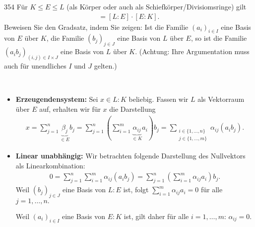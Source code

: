 \begin{algebraUE}{354}
Für $K \leq E \leq L$ (als Körper oder auch als Schiefkörper/Divisiomsringe) gilt
\begin{align*}
  [L:K] = [L:E]\cdot[E:K].
\end{align*}
Beweisen Sie den Gradsatz, indem Sie zeigen: Ist die Familie $(a_i)_{i \in I}$
eine Basis von $E$ über $K$, die Familie $(b_j)_{j \in J}$ eine Basis von $L$ über $E$,
so ist die Familie $(a_ib_j)_{(i,j) \in I \times J}$ eine Basis von $L$ über $K$.
(Achtung: Ihre Argumentation muss auch für unendliches $I$ und $J$ gelten.)

\end{algebraUE}

\begin{solution}
\leavevmode \\
  \begin{itemize}
      \item \textbf{Erzeugendensystem:} Sei $x \in L:K$ beliebig. Fassen wir $L$ als Vektorraum über $E$ auf, erhalten wir für $x$
      die Darstellung
  \begin{align*}
      x = \sum_{j=1}^n \underbrace{\beta_j}_{\in E} b_j = \sum_{j=1}^n \left(\sum_{i=1}^m \underbrace{\alpha_{ij}}_{\in K} a_i \right) b_j = \sum_{\substack{i \in \{1, ..., n\} \\ {j\in \{1,...,m\}}}} \alpha_{ij} (a_i b_j).
  \end{align*}
  \item \textbf{Linear unabhängig:} Wir betrachten folgende Darstellung des Nullvektors als Linearkombination:
  \begin{align*}
      0 = \sum_{j=1}^n \sum_{i=1}^m \alpha_{ij} (a_i b_j) = \sum_{j=1}^n \left(\sum_{i=1}^m \alpha_{ij} a_i\right) b_j.
  \end{align*}
  Weil $(b_j)_{j \in J}$ eine Basis von $L:E$ ist, folgt $\sum_{i=1}^m \alpha_{ij} a_i = 0$ für alle $j = 1,\dots,n.$

  Weil $(a_i)_{i \in I}$ eine Basis von $E:K$ ist, gilt daher für alle $i = 1,\dots,m$: $\alpha_{ij} = 0$.
  \end{itemize}
\end{solution}

